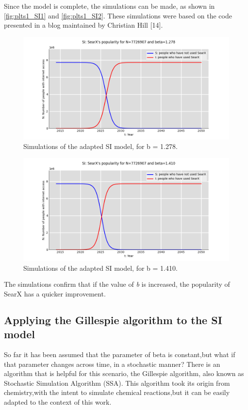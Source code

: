 \documentclass{article}
\begin{document}
Since the model is complete, the simulations can be made, as shown in \autoref{fig:plts1_SI1} and \autoref{fig:plts1_SI2}. These simulations were based on the code presented in a blog maintained by Christian Hill [14].

\begin{figure}[h]
    \centering
    \includegraphics[width=0.8\linewidth]{plts1_SI1}
    \caption{Simulations‌ ‌of‌ ‌the‌ ‌adapted‌ ‌SI‌ ‌model,‌ ‌for‌ b = 1.278.}
    \label{fig:plts1_SI1}
\end{figure}

\begin{figure}[h]
    \centering
    \includegraphics[width=0.8\linewidth]{plts1_SI2}
    \caption{Simulations‌ ‌of‌ ‌the‌ ‌adapted‌ ‌SI‌ ‌model,‌ ‌for‌ ‌b = 1.410.‌}
    \label{fig:plts1_SI2}
\end{figure}

The‌ ‌simulations‌ ‌confirm‌ ‌that‌ ‌if‌ ‌the‌ ‌value‌ ‌of‌ ‌\emph{b‌} ‌is‌ ‌increased,‌ ‌the‌ ‌popularity‌ ‌of‌ ‌SearX‌ ‌has‌ ‌a‌ ‌quicker‌‌ improvement.‌

\subsection{Applying‌ ‌the‌ ‌Gillespie‌ ‌algorithm‌ ‌to‌ ‌the‌ ‌SI‌ ‌model‌}

So‌ ‌far‌ ‌it‌ ‌has‌ ‌been‌ ‌assumed‌ ‌that‌ ‌the‌‌ parameter‌‌ of‌‌ beta‌‌ is‌‌ constant,‌‌but‌‌ what‌‌ if‌‌ that‌‌ parameter‌‌ changes‌ ‌across‌ ‌time,‌ ‌in‌ ‌a‌ ‌stochastic‌ ‌manner?‌ ‌There‌ ‌is‌ ‌an‌ ‌algorithm‌ ‌that‌ ‌is‌ ‌helpful‌ ‌for‌ ‌this‌‌ scenario,‌ ‌the‌ ‌Gillespie‌ ‌algorithm,‌ ‌also‌ ‌known‌ ‌as‌ ‌Stochastic‌ ‌Simulation‌ ‌Algorithm‌ ‌(SSA).‌ ‌This‌‌
algorithm‌‌ took‌‌ its‌‌ origin‌‌ from‌‌ chemistry,‌‌with‌‌ the‌‌ intent ‌‌to ‌‌simulate ‌‌chemical ‌‌reactions,‌‌but‌‌ it‌‌ can‌‌
be‌ ‌easily‌ ‌adapted‌ ‌to‌ ‌the‌ ‌context‌ ‌of‌ ‌this‌ ‌work.‌‌ ‌
\end{document}
